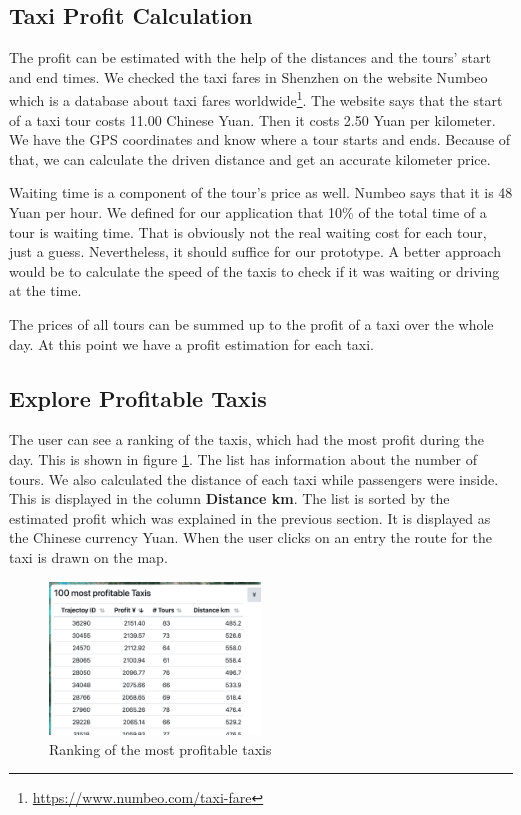 \documentclass[10pt]{sig-alternate}
\begin{document}
\subsection{Taxi Profit Calculation}

The profit can be estimated with the help of the distances and the tours' start and end times. We checked the taxi fares in Shenzhen on the website Numbeo which is a database about taxi fares worldwide\footnote{\href{https://www.numbeo.com/taxi-fare/country_result.jsp?country=China}{https://www.numbeo.com/taxi-fare}}. The website says that the start of a taxi tour costs 11.00 Chinese Yuan. Then it costs 2.50 Yuan per kilometer. We have the GPS coordinates and know where a tour starts and ends. Because of that, we can calculate the driven distance and get an accurate kilometer price.

Waiting time is a component of the tour's price as well. Numbeo says that it is 48 Yuan per hour. We defined for our application that 10\% of the total time of a tour is waiting time. That is obviously not the real waiting cost for each tour, just a guess. Nevertheless, it should suffice for our prototype. A better approach would be to calculate the speed of the taxis to check if it was waiting or driving at the time.

The prices of all tours can be summed up to the profit of a taxi over the whole day. At this point we have a profit estimation for each taxi.

\subsection{Explore Profitable Taxis}

The user can see a ranking of the taxis, which had the most profit during the day. This is shown in figure \ref{fig:ranking}. The list has information about the number of tours. We also calculated the distance of each taxi while passengers were inside. This is displayed in the column \textbf{Distance km}. The list is sorted by the estimated profit which was explained in the previous section. It is displayed as the Chinese currency Yuan. When the user clicks on an entry the route for the taxi is drawn on the map.\\

\begin{figure}[ht]
\centering
\includegraphics[width=0.5\textwidth]{img/ranking.png}
\caption{Ranking of the most profitable taxis}
\label{fig:ranking}
\end{figure}
\end{document}
